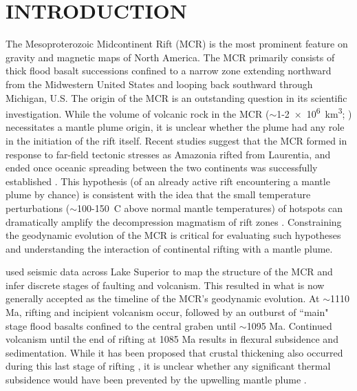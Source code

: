 \documentclass[11pt,letterpaper]{article}
\begin{document}
\section*{INTRODUCTION}
The Mesoproterozoic Midcontinent Rift (MCR) is the most prominent feature on gravity and magnetic maps of North America. The MCR primarily consists of thick flood basalt successions confined to a narrow zone extending northward from the Midwestern United States and looping back southward through Michigan, U.S. The origin of the MCR is an outstanding question in its scientific investigation. While the volume of volcanic rock in the MCR ($\sim$1-\SI{2e6}{km^3}; \cite{Hutchinson1990a}) necessitates a mantle plume origin, it is unclear whether the plume had any role in the initiation of the rift itself. Recent studies suggest that the MCR formed in response to far-field tectonic stresses as Amazonia rifted from Laurentia, and ended once oceanic spreading between the two continents was successfully established \cite{Stein2014a}. This hypothesis (of an already active rift encountering a mantle plume by chance) is consistent with the idea that the small temperature perturbations ($\sim$100-150\textdegree\ C above normal mantle temperatures) of hotspots can dramatically amplify the decompression magmatism of rift zones \citep{White1989a}. Constraining the geodynamic evolution of the MCR is critical for evaluating such hypotheses and understanding the interaction of continental rifting with a mantle plume.\par
\cite{Cannon1992a} used seismic data across Lake Superior to map the structure of the MCR and infer discrete stages of faulting and volcanism. This resulted in what is now generally accepted as the timeline of the MCR's geodynamic evolution. At $\sim$1110 Ma, rifting and incipient volcanism occur, followed by an outburst of ``main" stage flood basalts confined to the central graben until $\sim$1095 Ma. Continued volcanism until the end of rifting at 1085 Ma results in flexural subsidence and sedimentation. While it has been proposed that crustal thickening also occurred during this last stage of rifting \citep{Stein2015a}, it is unclear whether any significant thermal subsidence would have been prevented by the upwelling mantle plume \citep{White1997a}. 
\end{document}
